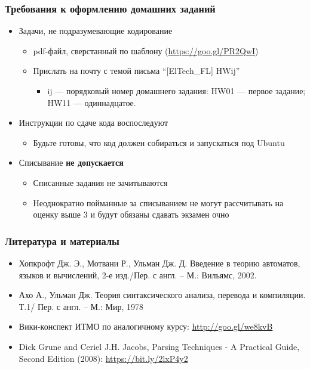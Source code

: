 \documentclass{beamer}
\begin{document}
\begin{frame}[fragile]
  \transwipe[direction=90]
  \frametitle{Требования к оформлению домашних заданий}
  \begin{itemize}
    \item Задачи, не подразумевающие кодирование
    \begin{itemize}
      \item pdf-файл, сверстанный по 
шаблону (\url{https://goo.gl/PR2QwI})
      \item Прислать на почту с темой письма ``[ElTech\_FL] HWij''
      \begin{itemize}
        \item ij --- порядковый номер домашнего задания: HW01 --- первое задание; HW11 --- одиннадцатое. 
      \end{itemize}
    \end{itemize}
    \item Инструкции по сдаче кода воспоследуют
    \begin{itemize}
      \item Будьте готовы, что код должен собираться и запускаться под Ubuntu
    \end{itemize}
    \item Списывание \textbf{не допускается}
    \begin{itemize}
      \item Списанные задания не зачитываются
      \item Неоднократно пойманные за списыванием не могут рассчитывать на оценку выше 3 и будут обязаны сдавать экзамен очно
    \end{itemize}
  \end{itemize}
\end{frame}

\begin{frame}[fragile]
  \transwipe[direction=90]
  \frametitle{Литература и материалы}
  \begin{itemize}
    \item Хопкрофт Дж. Э., Мотвани Р., Ульман Дж. Д. Введение в теорию автоматов, языков и вычислений, 2-е изд./Пер. с англ. – М.: Вильямс, 2002.
    \item Ахо А., Ульман Дж. Теория синтаксического анализа, перевода и компиляции. Т.1/ Пер. с англ. – М.: Мир, 1978
    \item Вики-конспект ИТМО по аналогичному курсу: \url{http://goo.gl/we8kvB}
    \item Dick Grune and Ceriel J.H. Jacobs, Parsing Techniques - A Practical Guide, Second Edition (2008): \url{https://bit.ly/2lxP4y2} 
  \end{itemize}
\end{frame}
\end{document}

